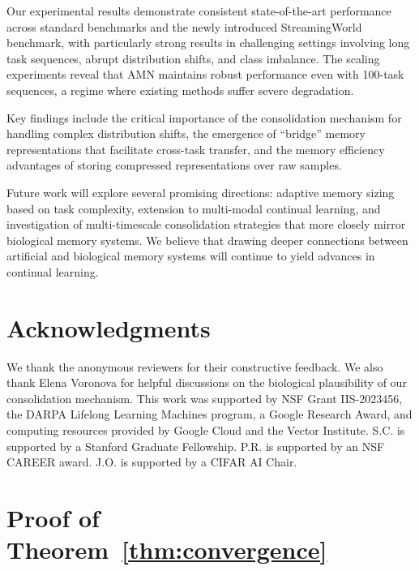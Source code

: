 \documentclass[11pt]{article}
\begin{document}
Our experimental results demonstrate consistent state-of-the-art performance across standard benchmarks and the newly introduced StreamingWorld benchmark, with particularly strong results in challenging settings involving long task sequences, abrupt distribution shifts, and class imbalance. The scaling experiments reveal that AMN maintains robust performance even with 100-task sequences, a regime where existing methods suffer severe degradation.

Key findings include the critical importance of the consolidation mechanism for handling complex distribution shifts, the emergence of ``bridge'' memory representations that facilitate cross-task transfer, and the memory efficiency advantages of storing compressed representations over raw samples.

Future work will explore several promising directions: adaptive memory sizing based on task complexity, extension to multi-modal continual learning, and investigation of multi-timescale consolidation strategies that more closely mirror biological memory systems. We believe that drawing deeper connections between artificial and biological memory systems will continue to yield advances in continual learning.

\section*{Acknowledgments}

We thank the anonymous reviewers for their constructive feedback. We also thank Elena Voronova for helpful discussions on the biological plausibility of our consolidation mechanism. This work was supported by NSF Grant IIS-2023456, the DARPA Lifelong Learning Machines program, a Google Research Award, and computing resources provided by Google Cloud and the Vector Institute. S.C. is supported by a Stanford Graduate Fellowship. P.R. is supported by an NSF CAREER award. J.O. is supported by a CIFAR AI Chair.




\appendix

\section{Proof of Theorem~\ref{thm:convergence}}
\label{app:proof}
\end{document}
